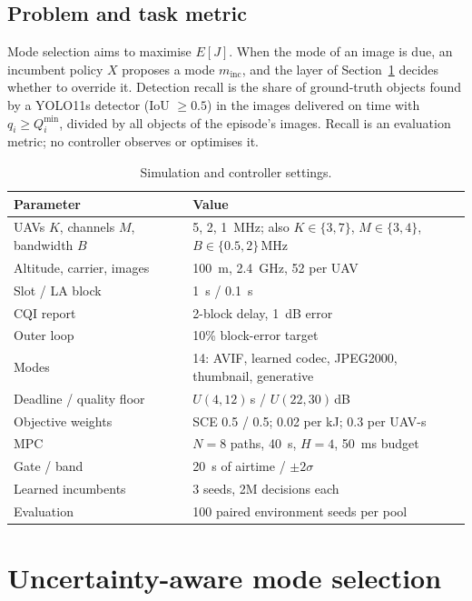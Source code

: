 \documentclass[final,3p,times,twocolumn]{elsarticle}
\begin{document}
\subsection{Problem and task metric}
Mode selection aims to maximise $E[J]$. When the mode of an image is due, an incumbent policy $X$ proposes a mode
$m_{\mathrm{inc}}$, and the layer of Section~\ref{sec:method} decides whether to override it. Detection recall is the
share of ground-truth objects found by a YOLO11s detector \cite{yolo11} (IoU $\ge 0.5$) in the images delivered on
time with $q_i\ge Q_i^{\min}$, divided by all objects of the episode's images. Recall is an evaluation metric; no
controller observes or optimises it.

\begin{table}[t]
\caption{Simulation and controller settings.}
\label{tab:settings}
\centering
\footnotesize
\begin{tabular}{@{}p{}p{}@{}}
\toprule
Parameter & Value \\
\midrule
UAVs $K$, channels $M$, bandwidth $B$ & 5, 2, \SI{1}{MHz}; also $K{\in}\{3,7\}$, $M{\in}\{3,4\}$, $B{\in}\{0.5,2\}$\,MHz \\
Altitude, carrier, images & \SI{100}{m}, \SI{2.4}{GHz}, 52 per UAV \\
Slot / LA block & \SI{1}{s} / \SI{0.1}{s} \\
CQI report & 2-block delay, \SI{1}{dB} error \\
Outer loop & 10\% block-error target \\
Modes & 14: AVIF, learned codec, JPEG2000, thumbnail, generative \\
Deadline / quality floor & $U(4,12)$\,s / $U(22,30)$\,dB \\
Objective weights & SCE 0.5 / 0.5; 0.02 per kJ; 0.3 per UAV-s \\
MPC & $N{=}8$ paths, \SI{40}{s}, $H{=}4$, \SI{50}{ms} budget \\
Gate / band & \SI{20}{s} of airtime / $\pm 2\sigma$ \\
Learned incumbents & 3 seeds, 2M decisions each \\
Evaluation & 100 paired environment seeds per pool \\
\bottomrule
\end{tabular}
\end{table}

\section{Uncertainty-aware mode selection}\label{sec:method}
\end{document}
